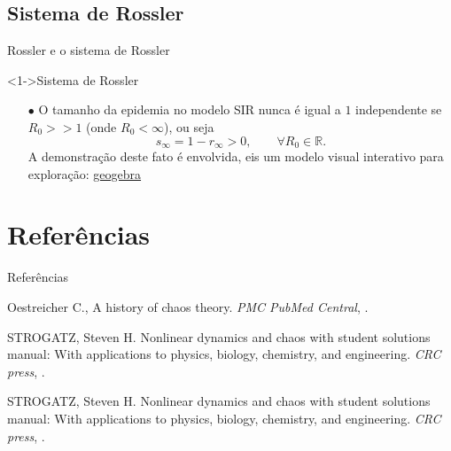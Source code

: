 \documentclass{beamer}
\begin{document}
\subsection{Sistema de Rossler}
\begin{frame}{Rossler e o sistema de Rossler}
    \begin{exampleblock}
	     <1->{Sistema de Rossler}
             \begin{itemize}
                 \item [$\bullet$] O tamanho da epidemia no modelo SIR nunca é igual a $1$ 
                     independente se $R_0 >> 1$ (onde $R_0 < \infty$), ou seja 
                    \[
                        s_\infty = 1 - r_\infty > 0, \qquad \forall R_0 \in \mathbb{R}.
                    \] 
                     A demonstração deste fato é envolvida, eis um modelo visual interativo para 
                     exploração: \href{https://www.geogebra.org/classic/pbddxfeh}{geogebra}                     
			\end{itemize}
	\end{exampleblock}
\end{frame}

\section{Referências}
\begin{frame}{Referências}


\begin{thebibliography}{3}

\beamertemplatearticlebibitems
{}
Oestreicher C.,
\newblock A history of chaos theory.
\newblock\emph{PMC PubMed Central},
.


\beamertemplatearticlebibitems
\bibitem{}
STROGATZ, Steven H. 
\newblock Nonlinear dynamics and chaos with student solutions manual: With applications to physics, biology, chemistry, and engineering.
\newblock\emph{CRC press},
.

\beamertemplatearticlebibitems
{}
STROGATZ, Steven H. 
\newblock Nonlinear dynamics and chaos with student solutions manual: With applications to physics, biology, chemistry, and engineering.
\newblock\emph{CRC press},
.

        \end{thebibliography}
\end{frame}
\end{document}
